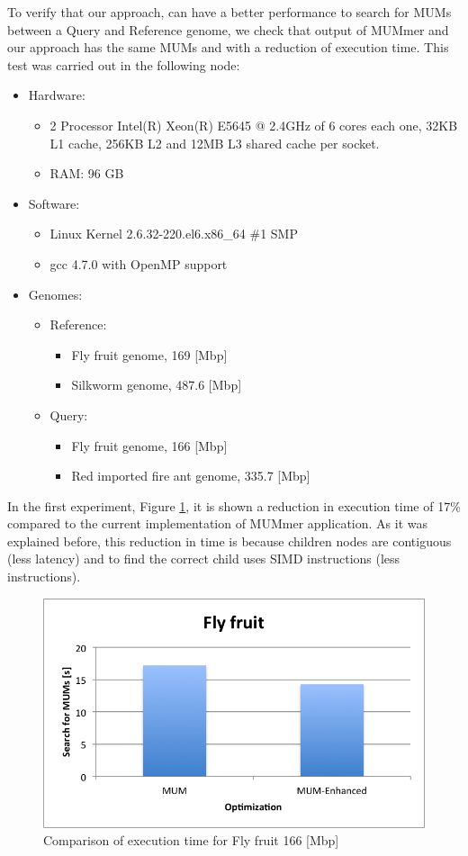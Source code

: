 \documentclass[conference]{IEEEtran}
\begin{document}
To verify that our approach, can have a better performance to search for MUMs between a Query and Reference genome, we check that output of MUMmer and our approach has the same MUMs and with a reduction of execution time. This test was carried out in the following node:
\begin{itemize}
\item Hardware:  
\begin{itemize}
\item 2 Processor Intel(R) Xeon(R) E5645 @ 2.4GHz of 6 cores each one, 32KB L1 cache, 256KB L2 and 12MB L3 shared cache per socket.
\item RAM: 96 GB
\end{itemize} 
\item  Software: 
\begin{itemize}
\item Linux Kernel 2.6.32-220.el6.x86\_64 \#1 SMP
\item gcc 4.7.0 with OpenMP support
\end{itemize}  
\item Genomes:
  \begin{itemize}
    \item Reference: 
    \begin{itemize}
    \item Fly fruit genome, 169 [Mbp]
    \item Silkworm genome, 487.6 [Mbp]
\end{itemize} 
    \item Query: 
    \begin{itemize}
    \item Fly fruit genome, 166 [Mbp] 
    \item Red imported fire ant genome, 335.7 [Mbp]
    \end{itemize}
  \end{itemize}
\end{itemize}

In the first experiment, Figure \ref{s1}, it is shown a reduction in execution time of 17\% compared to the current implementation of MUMmer application. As it was explained before, this reduction in time is because children nodes are contiguous (less latency) and to find the correct child uses SIMD instructions (less instructions).
\begin{figure}[hbtp]
\centering
\includegraphics[scale=0.5]{serial1.png}
\caption{Comparison of execution time for Fly fruit 166 [Mbp]}
\label{s1}
\end{figure}
\end{document}
